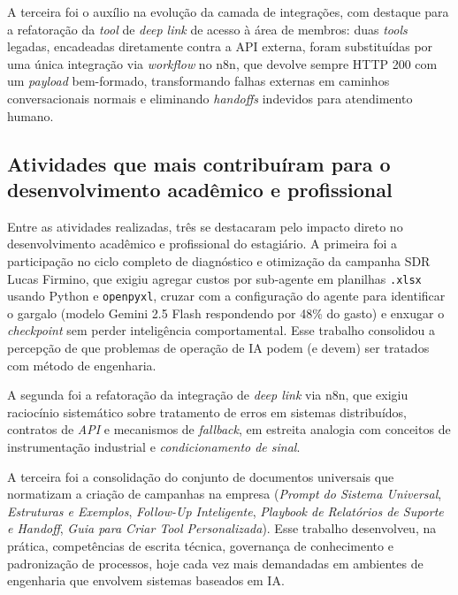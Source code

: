 \documentclass[12pt,a4paper,oneside]{article}
\begin{document}
A terceira foi o auxílio na evolução da camada de integrações, com destaque para a refatoração da \textit{tool} de \textit{deep link} de acesso à área de membros: duas \textit{tools} legadas, encadeadas diretamente contra a API externa, foram substituídas por uma única integração via \textit{workflow} no n8n, que devolve sempre HTTP 200 com um \textit{payload} bem-formado, transformando falhas externas em caminhos conversacionais normais e eliminando \textit{handoffs} indevidos para atendimento humano.

\subsection{Atividades que mais contribuíram para o desenvolvimento acadêmico e profissional}

Entre as atividades realizadas, três se destacaram pelo impacto direto no desenvolvimento acadêmico e profissional do estagiário. A primeira foi a participação no ciclo completo de diagnóstico e otimização da campanha SDR Lucas Firmino, que exigiu agregar custos por sub-agente em planilhas \texttt{.xlsx} usando Python e \texttt{openpyxl}, cruzar com a configuração do agente para identificar o gargalo (modelo Gemini 2.5 Flash respondendo por 48\% do gasto) e enxugar o \textit{checkpoint} sem perder inteligência comportamental. Esse trabalho consolidou a percepção de que problemas de operação de IA podem (e devem) ser tratados com método de engenharia.

A segunda foi a refatoração da integração de \textit{deep link} via n8n, que exigiu raciocínio sistemático sobre tratamento de erros em sistemas distribuídos, contratos de \textit{API} e mecanismos de \textit{fallback}, em estreita analogia com conceitos de instrumentação industrial e \textit{condicionamento de sinal}.

A terceira foi a consolidação do conjunto de documentos universais que normatizam a criação de campanhas na empresa (\textit{Prompt do Sistema Universal}, \textit{Estruturas e Exemplos}, \textit{Follow-Up Inteligente}, \textit{Playbook de Relatórios de Suporte e Handoff}, \textit{Guia para Criar Tool Personalizada}). Esse trabalho desenvolveu, na prática, competências de escrita técnica, governança de conhecimento e padronização de processos, hoje cada vez mais demandadas em ambientes de engenharia que envolvem sistemas baseados em IA.

\end{document}
